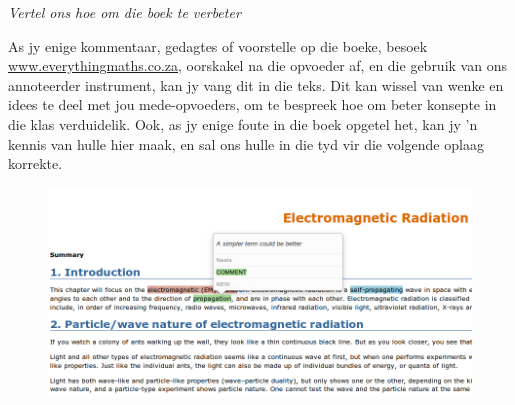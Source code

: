 \pagebreak
{\normalfont\sffamily\fontsize{22}\normalfont\itshape Vertel ons hoe om die boek te verbeter } \par

{\Large
As jy enige kommentaar, gedagtes of voorstelle op die boeke, besoek \underline{www.everythingmaths.co.za}, oorskakel na die opvoeder af, en die gebruik van ons annoteerder instrument, kan jy vang dit in die teks. Dit kan wissel van wenke en idees te deel met jou mede-opvoeders, om te bespreek hoe om beter konsepte in die klas verduidelik. Ook, as jy enige foute in die boek opgetel het, kan jy 'n kennis van hulle hier maak, en sal ons hulle in die tyd vir die volgende oplaag korrekte.
 \par


\begin{figure}[H]
\centering
\includegraphics[width=\textwidth]{../title_images/annotater.png}
\end{figure}


}
% 
% 
% 
% 



